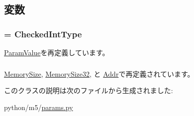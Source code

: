 \subsection{変数}
\hypertarget{classm5_1_1params_1_1CheckedInt_adfc4d1824f4ecdcbb04ceafc5bbc933e}{
\subsubsection[{\_\-\_\-metaclass\_\-\_\-}]{ = {\bf CheckedIntType}}}
\label{classm5_1_1params_1_1CheckedInt_adfc4d1824f4ecdcbb04ceafc5bbc933e}


\hyperlink{classm5_1_1params_1_1ParamValue_adfc4d1824f4ecdcbb04ceafc5bbc933e}{ParamValue}を再定義しています。\hypertarget{classm5_1_1params_1_1CheckedInt_afcc7a4b78ecd8fa7e713f8cfa0f51017}{
\subsubsection[{value}]{}}
\label{classm5_1_1params_1_1CheckedInt_afcc7a4b78ecd8fa7e713f8cfa0f51017}


\hyperlink{classm5_1_1params_1_1MemorySize_afcc7a4b78ecd8fa7e713f8cfa0f51017}{MemorySize}, \hyperlink{classm5_1_1params_1_1MemorySize32_afcc7a4b78ecd8fa7e713f8cfa0f51017}{MemorySize32}, と \hyperlink{classm5_1_1params_1_1Addr_afcc7a4b78ecd8fa7e713f8cfa0f51017}{Addr}で再定義されています。

このクラスの説明は次のファイルから生成されました:\begin{DoxyCompactItemize}
\item 
python/m5/\hyperlink{params_8py}{params.py}\end{DoxyCompactItemize}
